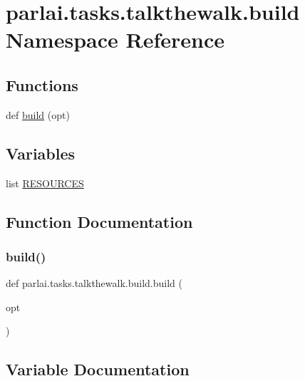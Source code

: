 \hypertarget{namespaceparlai_1_1tasks_1_1talkthewalk_1_1build}{}\section{parlai.\+tasks.\+talkthewalk.\+build Namespace Reference}
\label{namespaceparlai_1_1tasks_1_1talkthewalk_1_1build}
\subsection*{Functions}
\begin{DoxyCompactItemize}
\item 
def \hyperlink{namespaceparlai_1_1tasks_1_1talkthewalk_1_1build_ad51286ba43b5d307706a281240d1aa7b}{build} (opt)
\end{DoxyCompactItemize}
\subsection*{Variables}
\begin{DoxyCompactItemize}
\item 
list \hyperlink{namespaceparlai_1_1tasks_1_1talkthewalk_1_1build_a066aff1a760af71ebeab7c6e9fe1fbc5}{R\+E\+S\+O\+U\+R\+C\+ES}
\end{DoxyCompactItemize}


\subsection{Function Documentation}
\mbox{\label{namespaceparlai_1_1tasks_1_1talkthewalk_1_1build_ad51286ba43b5d307706a281240d1aa7b}} 
\subsubsection{\texorpdfstring{build()}{build()}}
{\footnotesize\ttfamily def parlai.\+tasks.\+talkthewalk.\+build.\+build (\begin{DoxyParamCaption}\item[{}]{opt }\end{DoxyParamCaption})}



\subsection{Variable Documentation}
\mbox{\label{namespaceparlai_1_1tasks_1_1talkthewalk_1_1build_a066aff1a760af71ebeab7c6e9fe1fbc5}} 

